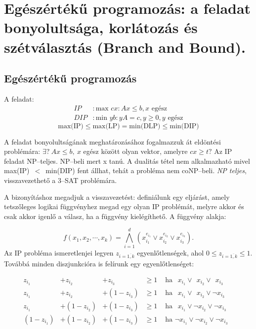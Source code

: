 ﻿\newpage
\section{Egészértékű programozás: a feladat bonyolultsága, korlátozás és szétválasztás (Branch and Bound).}

\subsection{Egészértékű programozás}
A feladat:
\begin{align*}
IP &: \mbox{max }{cx: Ax \leq b, x \mbox{ egész}} \\
DIP &: \mbox{min }{yb: yA=c, y \geq 0, y \mbox{ egész}}
\end{align*}
\[ \mbox{max(IP)} \leq \mbox{max(LP)}= \mbox{min(DLP)} \leq \mbox{min(DIP)} \]

A feladat bonyolultságának meghatározásához fogalmazzuk át eldöntési problémára:
$\exists?~Ax \leq b,~ x$ egész között olyan vektor, amelyre $cx \geq t?$ Az IP
feladat NP--teljes. NP--beli mert x tanú. A dualitás tétel nem alkalmazható
mivel max(IP)~$<$~min(DIP) fent állhat, tehát a probléma nem coNP--beli. \emph{NP
teljes}, visszavezethető a $3$--SAT problémára.

A bizonyításhoz megadjuk a visszavezetést: definiálunk egy eljárást, amely tetszőleges
logikai függvényhez megad egy olyan IP problémát, melyre akkor és csak akkor igenlő a
válasz, ha a függvény kielégíthető. A függvény alakja:

\[ f(x_1, x_2, \cdots, x_k) = \bigwedge_{i=1}^{d}{\left( x_{i_1}^{e_{i_1}} \vee 
x_{i_2}^{e_{i_2}} \vee x_{i_3}^{e_{i_3}}\right).} 
\]
Az IP probléma ismeretlenjei legyen $z_{i=\overline{1,k}}$ egyenlőtlenségek, ahol 
$0 \leq z_{i=\overline{1,k}} \leq 1$. Továbbá minden diszjunkcióra is felírunk egy
egyenlőtlenséget:


\begin{align*}
z_{i_1} &+ z_{i_2} &+      z_{i_3}  &\geq 1 & \mbox{ ha }~~x_{i_1} \vee~~x_{i_2}\vee~~x_{i_3}& \\
z_{i_1} &+ z_{i_2} &+ (1 - z_{i_3}) &\geq 1 & \mbox{ ha }~~x_{i_1} \vee~~x_{i_2} \vee \neg x_{i_3}& \\
z_{i_1} &+ (1-z_{i_2}) &+ (1 - z_{i_3})  &\geq 1 & \mbox{ ha }~~x_{i_1} \vee \neg x_{i_2} \vee\neg x_{i_3}&\\
(1-z_{i_1}) &+ (1-z_{i_2}) &+ (1 - z_{i_3})  &\geq 1 & \mbox{ ha } \neg x_{i_1} \vee \neg x_{i_2} \vee \neg x_{i_3}&
\end{align*}

